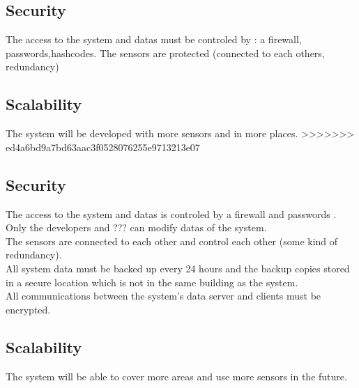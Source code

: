 \subsection{Security}
The access to the system and datas must be controled by : a firewall, passwords,hashcodes.
The sensors are protected (connected to each others, redundancy)

\subsection{Scalability}
The system will be developed with more sensors and in more places.
>>>>>>> ed4a6bd9a7bd63aac3f0528076255e9713213e07

\subsection{Security}
The access to the system and datas is controled by a firewall and passwords .\\
Only the developers and ??? can modify datas of the system.\\
The sensors are connected to each other and control each other (some kind of redundancy).\\
All system data must be backed up every 24 hours and the backup copies stored in a secure location which is not in the same building as the system.\\
All communications between the system’s data server and clients must be encrypted.\\

\subsection{Scalability}
The system will be able to cover more areas and use more sensors in the future.


